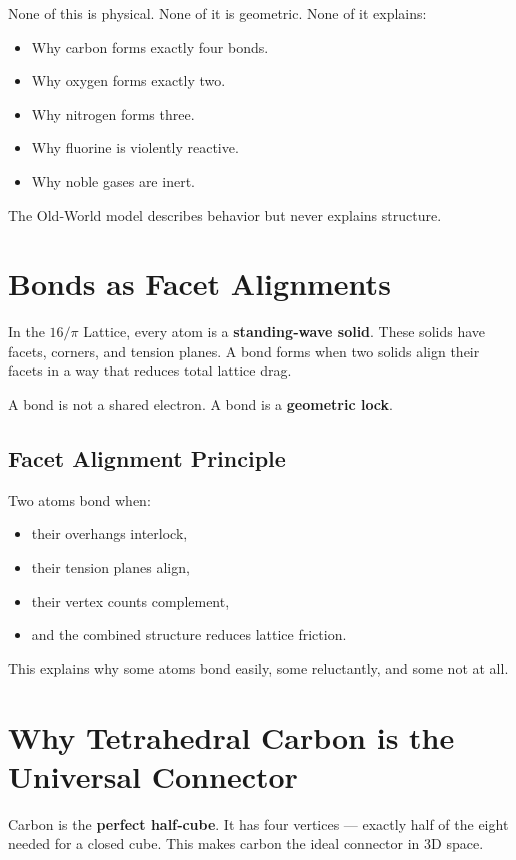 \documentclass[11pt, letterpaper, openany]{book}
\begin{document}
None of this is physical. None of it is geometric. None of it explains:

\begin{itemize}
    \item Why carbon forms exactly four bonds.
    \item Why oxygen forms exactly two.
    \item Why nitrogen forms three.
    \item Why fluorine is violently reactive.
    \item Why noble gases are inert.
\end{itemize}

The Old‑World model describes behavior but never explains structure.

\section{Bonds as Facet Alignments}

In the $16/\pi$ Lattice, every atom is a \textbf{standing‑wave solid}. These solids have facets,
corners, and tension planes. A bond forms when two solids align their facets in a way that
reduces total lattice drag.

A bond is not a shared electron.  
A bond is a \textbf{geometric lock}.

\subsection*{Facet Alignment Principle}

Two atoms bond when:

\begin{itemize}
    \item their overhangs interlock,
    \item their tension planes align,
    \item their vertex counts complement,
    \item and the combined structure reduces lattice friction.
\end{itemize}

This explains why some atoms bond easily, some reluctantly, and some not at all.

\section{Why Tetrahedral Carbon is the Universal Connector}

Carbon is the \textbf{perfect half‑cube}. It has four vertices — exactly half of the eight needed
for a closed cube. This makes carbon the ideal connector in 3D space.
\end{document}
